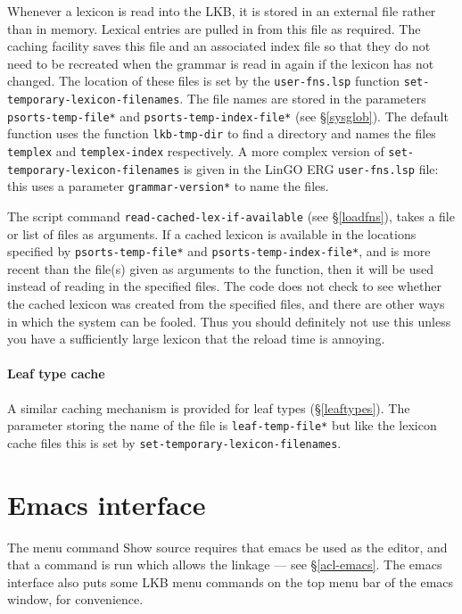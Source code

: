 \documentclass[12pt]{report}
\newcommand{\filename}[1]{{\tt #1}}
\newcommand{\functionname}[1]{{\tt #1}}
\newcommand{\lkbparam}[1]{{\tt #1}}
\newcommand{\lkbmenucommand}{{\bf}}
\begin{document}
Whenever a lexicon is read into the LKB, it is stored in an external file
rather than in memory.  Lexical entries are pulled in from this file as
required.  The caching facility saves this file and an associated index file
so that
they do not need to be recreated when the grammar is read in again if the
lexicon has not changed.  
The location of these files is set by the \filename{user-fns.lsp} 
function
\functionname{set-temporary-lexicon-filenames}.  The file names are
stored in the parameters \lkbparam{*psorts-temp-file*}
and \lkbparam{*psorts-temp-index-file*} (see \S\ref{sysglob}).
The default function uses the function \functionname{lkb-tmp-dir}
to find a directory and names the files \filename{templex} and 
\filename{templex-index} respectively.  A more complex version of
\functionname{set-temporary-lexicon-filenames} is given in
the LinGO ERG \filename{user-fns.lsp} file: this uses a 
parameter \lkbparam{*grammar-version*} to name the files.

The script command
\functionname{read-cached-lex-if-available} (see \S\ref{loadfns}), takes a file
or list of files as arguments.  If a cached lexicon is available in the
locations specified by \lkbparam{*psorts-temp-file*} and
\lkbparam{*psorts-temp-index-file*}, and is more recent than the file(s) given
as arguments to the function, then it will be used instead of reading in the
specified files.  The code does not check to see whether the cached lexicon was
created from the specified files, and there are other ways in which the system
can be fooled.  Thus you should definitely not use this unless you have a
sufficiently large lexicon that the reload time is annoying.

\paragraph{Leaf type cache}

A similar caching mechanism is provided for leaf types (\S\ref{leaftypes}).
The parameter storing the name of the file is \lkbparam{*leaf-temp-file*}
but like the lexicon cache files this is set by 
\functionname{set-temporary-lexicon-filenames}.

\section{Emacs interface}
\label{emacs}

The menu command {\lkbmenucommand Show source} requires that emacs be 
used as the editor, and that a command is run which
allows the linkage --- see \S\ref{acl-emacs}.
The emacs interface also puts some LKB menu commands on the top
menu bar of the emacs window, for convenience.
\end{document}
